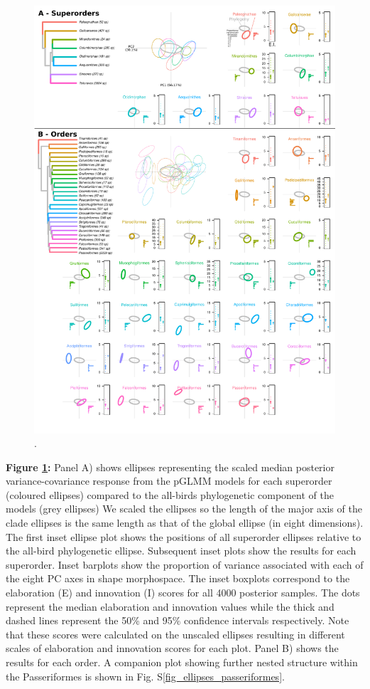 \documentclass[12pt,letterpaper]{article}
\begin{document}
\begin{figure}[!htbp]
\centering
   \includegraphics[width=1\textwidth]{Figures/ellipses.pdf}
\caption{.}
\label{Fig:ellipses}
\end{figure}
\bigskip

\noindent \textbf{Figure \ref{Fig:ellipses}:}
Panel A) shows  ellipses representing the scaled median posterior variance-covariance response from the pGLMM models for each superorder (coloured ellipses) compared to the all-birds phylogenetic component of the models (grey ellipses)
We scaled the ellipses so the length of the major axis of the clade ellipses is the same length as that of the global ellipse (in eight dimensions).
The first inset ellipse plot shows the positions of all superorder ellipses relative to the all-bird phylogenetic ellipse.
Subsequent inset plots show the results for each superorder. Inset barplots show the proportion of variance associated with each of the eight PC axes in shape morphospace.
The inset boxplots correspond to the elaboration (E) and innovation (I) scores for all 4000 posterior samples.
The dots represent the median elaboration and innovation values while the thick and dashed lines represent the 50\% and 95\% confidence intervals respectively.
Note that these scores were calculated on the unscaled ellipses resulting in different scales of elaboration and innovation scores for each plot. Panel B) shows  the results for each order.
A companion plot showing further nested structure within the Passeriformes is shown in Fig. S\ref{fig_ellipses_passeriformes}.
\end{document}
